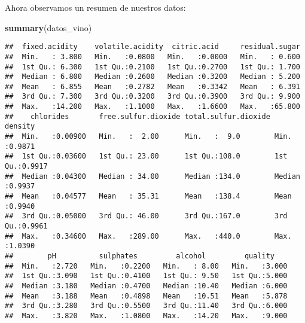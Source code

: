\documentclass[
]{article}
\newenvironment{Shaded}{\begin{snugshade}}{\end{snugshade}}
\newcommand{\FunctionTok}[1]{\textcolor[rgb]{0.13,0.29,0.53}{\textbf{#1}}}
\newcommand{\NormalTok}[1]{#1}
\begin{document}
Ahora observamos un resumen de nuestros datos:

\begin{Shaded}
\begin{Highlighting}[]
\FunctionTok{summary}\NormalTok{(datos\_vino)}
\end{Highlighting}
\end{Shaded}

\begin{verbatim}
##  fixed.acidity    volatile.acidity  citric.acid     residual.sugar  
##  Min.   : 3.800   Min.   :0.0800   Min.   :0.0000   Min.   : 0.600  
##  1st Qu.: 6.300   1st Qu.:0.2100   1st Qu.:0.2700   1st Qu.: 1.700  
##  Median : 6.800   Median :0.2600   Median :0.3200   Median : 5.200  
##  Mean   : 6.855   Mean   :0.2782   Mean   :0.3342   Mean   : 6.391  
##  3rd Qu.: 7.300   3rd Qu.:0.3200   3rd Qu.:0.3900   3rd Qu.: 9.900  
##  Max.   :14.200   Max.   :1.1000   Max.   :1.6600   Max.   :65.800  
##    chlorides       free.sulfur.dioxide total.sulfur.dioxide    density      
##  Min.   :0.00900   Min.   :  2.00      Min.   :  9.0        Min.   :0.9871  
##  1st Qu.:0.03600   1st Qu.: 23.00      1st Qu.:108.0        1st Qu.:0.9917  
##  Median :0.04300   Median : 34.00      Median :134.0        Median :0.9937  
##  Mean   :0.04577   Mean   : 35.31      Mean   :138.4        Mean   :0.9940  
##  3rd Qu.:0.05000   3rd Qu.: 46.00      3rd Qu.:167.0        3rd Qu.:0.9961  
##  Max.   :0.34600   Max.   :289.00      Max.   :440.0        Max.   :1.0390  
##        pH          sulphates         alcohol         quality     
##  Min.   :2.720   Min.   :0.2200   Min.   : 8.00   Min.   :3.000  
##  1st Qu.:3.090   1st Qu.:0.4100   1st Qu.: 9.50   1st Qu.:5.000  
##  Median :3.180   Median :0.4700   Median :10.40   Median :6.000  
##  Mean   :3.188   Mean   :0.4898   Mean   :10.51   Mean   :5.878  
##  3rd Qu.:3.280   3rd Qu.:0.5500   3rd Qu.:11.40   3rd Qu.:6.000  
##  Max.   :3.820   Max.   :1.0800   Max.   :14.20   Max.   :9.000
\end{verbatim}
\end{document}
